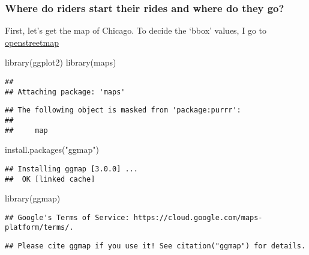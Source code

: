 \documentclass[
]{article}
\newenvironment{Shaded}{\begin{snugshade}}{\end{snugshade}}
\newcommand{\FunctionTok}[1]{\textcolor[rgb]{0.00,0.00,0.00}{#1}}
\newcommand{\NormalTok}[1]{#1}
\newcommand{\StringTok}[1]{\textcolor[rgb]{0.31,0.60,0.02}{#1}}
\begin{document}
\hypertarget{where-do-riders-start-their-rides-and-where-do-they-go}{%
\subsubsection{Where do riders start their rides and where do they
go?}\label{where-do-riders-start-their-rides-and-where-do-they-go}}

First, let's get the map of Chicago. To decide the `bbox' values, I go
to \href{http://www.openstreetmap.org}{openstreetmap}

\begin{Shaded}
\begin{Highlighting}[]
\FunctionTok{library}\NormalTok{(ggplot2)}
\FunctionTok{library}\NormalTok{(maps)}
\end{Highlighting}
\end{Shaded}

\begin{verbatim}
## 
## Attaching package: 'maps'
\end{verbatim}

\begin{verbatim}
## The following object is masked from 'package:purrr':
## 
##     map
\end{verbatim}

\begin{Shaded}
\begin{Highlighting}[]
\FunctionTok{install.packages}\NormalTok{(}\StringTok{"ggmap"}\NormalTok{)}
\end{Highlighting}
\end{Shaded}

\begin{verbatim}
## Installing ggmap [3.0.0] ...
##  OK [linked cache]
\end{verbatim}

\begin{Shaded}
\begin{Highlighting}[]
\FunctionTok{library}\NormalTok{(ggmap)}
\end{Highlighting}
\end{Shaded}

\begin{verbatim}
## Google's Terms of Service: https://cloud.google.com/maps-platform/terms/.
\end{verbatim}

\begin{verbatim}
## Please cite ggmap if you use it! See citation("ggmap") for details.
\end{verbatim}
\end{document}
